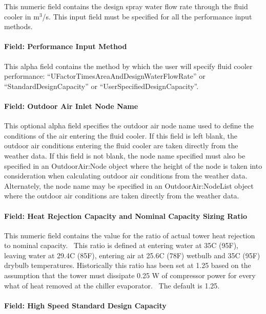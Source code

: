 This numeric field contains the design spray water flow rate through the fluid cooler in m\(^{3}\)/s. This input field must be specified for all the performance input methods.

\paragraph{Field: Performance Input Method}\label{field-performance-input-method-4}

This alpha field contains the method by which the user will specify fluid cooler performance: ``UFactorTimesAreaAndDesignWaterFlowRate'' or ``StandardDesignCapacity'' or ``UserSpecifiedDesignCapacity''.

\paragraph{Field: Outdoor Air Inlet Node Name}\label{field-outdoor-air-inlet-node-name-5}

This optional alpha field specifies the outdoor air node name used to define the conditions of the air entering the fluid cooler. If this field is left blank, the outdoor air conditions entering the fluid cooler are taken directly from the weather data. If this field is not blank, the node name specified must also be specified in an OutdoorAir:Node object where the height of the node is taken into consideration when calculating outdoor air conditions from the weather data. Alternately, the node name may be specified in an OutdoorAir:NodeList object where the outdoor air conditions are taken directly from the weather data.

\paragraph{Field: Heat Rejection Capacity and Nominal Capacity Sizing Ratio}\label{field-heat-rejection-capacity-and-nominal-capacity-sizing-ratio-4}

This numeric field contains the value for the ratio of actual tower heat rejection to nominal capacity.~ This ratio is defined at entering water at 35C (95F), leaving water at 29.4C (85F), entering air at 25.6C (78F) wetbulb and 35C (95F) drybulb temperatures. Historically this ratio has been set at 1.25 based on the assumption that the tower must dissipate 0.25 W of compressor power for every what of heat removed at the chiller evaporator.~ The default is 1.25.

\paragraph{Field: High Speed Standard Design Capacity}\label{field-high-speed-standard-design-capacity}

